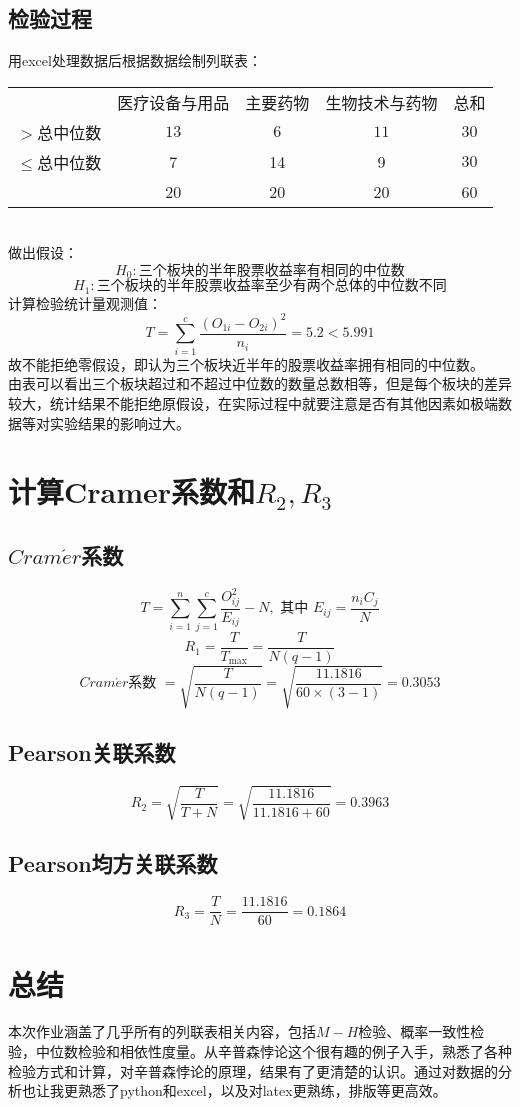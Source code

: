 \documentclass[a4paper, 11pt]{article}
\begin{document}
\subsection{检验过程}
用excel处理数据后根据数据绘制列联表：\\
\begin{table}[!h]
	\centering
	\begin{tabular}{ccccc}
		&医疗设备与用品&主要药物&生物技术与药物&总和\\
		\cline{2-4}
		\multicolumn{1}{c|}{$>$总中位数}&\multicolumn{1}{c|}{$ 13 $}&\multicolumn{1}{c|}{$ 6 $}&\multicolumn{1}{c|}{$ 11 $}&$ 30 $\\
		\cline{2-4}
		\multicolumn{1}{c|}{$ \leqslant $总中位数}&\multicolumn{1}{c|}{7}&\multicolumn{1}{c|}{14}&\multicolumn{1}{c|}{9}&$ 30 $\\
		\cline{2-4}
		&20&20&20&60
	\end{tabular}
\end{table}\\
做出假设：\\
$$H_{0}:\text{三个板块的半年股票收益率有相同的中位数}$$
$$H_{1}:\text{三个板块的半年股票收益率至少有两个总体的中位数不同}$$
计算检验统计量观测值：\\
$$T=\sum_{i=1}^{c} \frac{\left(O_{1 i}-O_{2 i}\right)^{2}}{n_{i}}=5.2<5.991$$
故不能拒绝零假设，即认为三个板块近半年的股票收益率拥有相同的中位数。\\
由表可以看出三个板块超过和不超过中位数的数量总数相等，但是每个板块的差异较大，统计结果不能拒绝原假设，在实际过程中就要注意是否有其他因素如极端数据等对实验结果的影响过大。
\section{计算Cramer系数和$R_{2},R_{3}$}
\subsection{$ Cram\acute{e}r$系数}
$$T=\sum_{i=1}^{n} \sum_{j=1}^{c} \frac{O_{i j}^{2}}{E_{i j}}-N, \text { 其中 } E_{i j}=\frac{n_{i} C_{j}}{N}$$
$$R_{1}=\frac{T}{T_{\max }}=\frac{T}{N(q-1)}$$
$$ Cram\acute{e}r \text {系数 }=\sqrt{\frac{T}{N(q-1)}}=\sqrt{\frac{11.1816}{60 \times(3-1)}}=0.3053$$
\subsection{Pearson关联系数}
$$R_{2}=\sqrt{\frac{T}{T+N}}=\sqrt{\frac{11.1816}{11.1816+60}}=0.3963$$
\subsection{Pearson均方关联系数}
$$R_{3}=\frac{T}{N}=\frac{11.1816}{60}=0.1864$$
\section{总结}
本次作业涵盖了几乎所有的列联表相关内容，包括$ M-H $检验、概率一致性检验，中位数检验和相依性度量。从辛普森悖论这个很有趣的例子入手，熟悉了各种检验方式和计算，对辛普森悖论的原理，结果有了更清楚的认识。通过对数据的分析也让我更熟悉了python和excel，以及对latex更熟练，排版等更高效。
\end{document}
